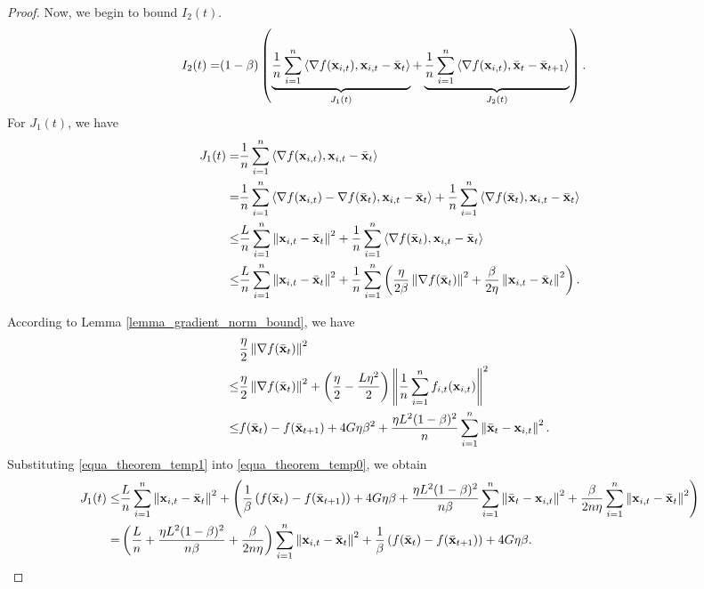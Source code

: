 \documentclass{article}
\begin{document}
\begin{proof}
Now, we begin to bound $I_2(t)$.
\begin{align}
\nonumber
I_2(t) = & (1-\beta) \left( \underbrace{ \frac{1}{n}\sum_{i=1}^n\left\langle\nabla f({\bf x}_{i,t}), {\bf x}_{i,t} - \bar{{\bf x}}_t  \right\rangle }_{J_1(t)} +  \underbrace{ \frac{1}{n}\sum_{i=1}^n\left\langle\nabla f({\bf x}_{i,t}), \bar{{\bf x}}_t - \bar{{\bf x}}_{t+1}  \right\rangle}_{J_2(t)} \right).
\end{align} For $J_1(t)$, we have
\begin{align}
\nonumber
J_1(t) = & \frac{1}{n}\sum_{i=1}^n\left\langle\nabla f({\bf x}_{i,t}), {\bf x}_{i,t} - \bar{{\bf x}}_t  \right\rangle \\ \nonumber
= & \frac{1}{n}\sum_{i=1}^n\left\langle\nabla f({\bf x}_{i,t}) - \nabla f(\bar{{\bf x}}_t), {\bf x}_{i,t} - \bar{{\bf x}}_t  \right\rangle + \frac{1}{n}\sum_{i=1}^n\left\langle\nabla f(\bar{{\bf x}}_t), {\bf x}_{i,t} - \bar{{\bf x}}_t  \right\rangle \\ \nonumber
\le & \frac{L}{n}\sum_{i=1}^n \left\lVert{\bf x}_{i,t} - \bar{{\bf x}}_t\right\rVert^2 + \frac{1}{n}\sum_{i=1}^n\left\langle\nabla f(\bar{{\bf x}}_t), {\bf x}_{i,t} - \bar{{\bf x}}_t  \right\rangle \\ \label{equa_theorem_temp0}
\le & \frac{L}{n}\sum_{i=1}^n \left\lVert{\bf x}_{i,t} - \bar{{\bf x}}_t\right\rVert^2 + \frac{1}{n}\sum_{i=1}^n\left( \frac{\eta}{2\beta}\left\lVert\nabla f(\bar{{\bf x}}_t)\right\rVert^2 + \frac{\beta}{2\eta}\left\lVert{\bf x}_{i,t} - \bar{{\bf x}}_t \right\rVert^2  \right).
\end{align}

According to Lemma \ref{lemma_gradient_norm_bound}, we have
\begin{align}
\nonumber
& \frac{\eta}{2}\left\lVert\nabla f(\bar{{\bf x}}_t)\right\rVert^2  \\ \nonumber
\le & \frac{\eta}{2}\left\lVert\nabla f(\bar{{\bf x}}_t)\right\rVert^2 + \left( \frac{\eta}{2} - \frac{L\eta^2}{2} \right)\left\lVert\frac{1}{n}\sum_{i=1}^n f_{i,t}({\bf x}_{i,t})\right\rVert^2 \\ \label{equa_theorem_temp1}
\le & f(\bar{{\bf x}}_t) - f(\bar{{\bf x}}_{t+1}) + 4G\eta\beta^2 +  \frac{\eta L^2(1-\beta)^2}{n}\sum_{i=1}^n\left\lVert\bar{{\bf x}}_t - {\bf x}_{i,t} \right\rVert^2.
\end{align} Substituting \eqref{equa_theorem_temp1} into \eqref{equa_theorem_temp0}, we obtain
\begin{align}
\nonumber
J_1(t) \le & \frac{L}{n}\sum_{i=1}^n \left\lVert{\bf x}_{i,t} - \bar{{\bf x}}_t\right\rVert^2 + \left(  \frac{1}{\beta}\left( f(\bar{{\bf x}}_t) - f(\bar{{\bf x}}_{t+1}) \right) + 4G\eta\beta +  \frac{\eta L^2(1-\beta)^2}{n\beta}\sum_{i=1}^n\left\lVert\bar{{\bf x}}_t - {\bf x}_{i,t} \right\rVert^2 + \frac{\beta}{2n\eta}\sum_{i=1}^n\left\lVert{\bf x}_{i,t} - \bar{{\bf x}}_t \right\rVert^2  \right) \\ \nonumber
= & \left(  \frac{L}{n} + \frac{\eta L^2(1-\beta)^2}{n\beta} + \frac{\beta}{2n\eta}  \right)\sum_{i=1}^n\left\lVert{\bf x}_{i,t} - \bar{{\bf x}}_t \right\rVert^2 + \frac{1}{\beta}\left( f(\bar{{\bf x}}_t) - f(\bar{{\bf x}}_{t+1}) \right) + 4G\eta\beta.
\end{align}


\end{proof}
\end{document}
